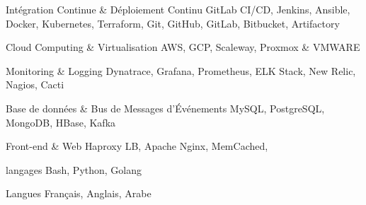 

\begin{cvskills}

  \cvskill
    {Intégration Continue \& Déploiement Continu} %
    {GitLab CI/CD, Jenkins, Ansible, Docker, Kubernetes, Terraform, Git, GitHub, GitLab, Bitbucket, Artifactory} %

 
  \cvskill
    {Cloud Computing \& Virtualisation} %
    {AWS, GCP, Scaleway, Proxmox \& VMWARE} %


  \cvskill
    {Monitoring \& Logging} %
    {Dynatrace, Grafana, Prometheus, ELK Stack, New Relic, Nagios, Cacti} %

  \cvskill
    {Base de données \& Bus de Messages d'Événements} %
    {MySQL, PostgreSQL, MongoDB, HBase, Kafka} %

  \cvskill
    {Front-end \& Web} %
    {Haproxy LB, Apache Nginx, MemCached,} %

  \cvskill
    {langages} %
    {Bash, Python, Golang} %

  \cvskill
    {Langues} %
    {Français, Anglais, Arabe} %

\end{cvskills}
